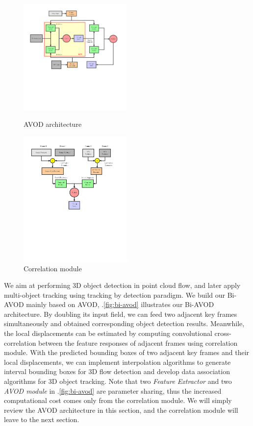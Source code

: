 \documentclass{bmvc2k}
\begin{document}
\begin{figure}
	\setlength{\abovecaptionskip}{-0.5cm}
	\begin{minipage}[t]{0.5\linewidth}
		\centering
		\includegraphics[trim={0cm, 8cm, 2cm, 0cm}, clip, width=2.2in]{images/AVOD.pdf}
		\caption{AVOD architecture}
		\label{fig:avod}
	\end{minipage}%
	\begin{minipage}[t]{0.5\linewidth}
		\centering
		\includegraphics[trim={0cm, 9cm, 2cm, 0cm}, clip, width=2.2in]{images/Correlation.pdf}
		\caption{Correlation module}
		\label{fig:correlation}
	\end{minipage}
\end{figure}

We aim at performing 3D object detection in point cloud flow, and later apply multi-object tracking using tracking by detection paradigm. We build our Bi-AVOD mainly based on AVOD\cite{ku2018joint}, \figurename .\ref{fig:bi-avod} illustrates our Bi-AVOD architecture. By doubling its input field, we can feed two adjacent key frames simultaneously and obtained corresponding object detection results. Meanwhile, the local displacements can be estimated by computing convolutional cross-correlation between the feature responses of adjacent frames using correlation module. With the predicted bounding boxes of two adjacent key frames and their local displacements, we can implement interpolation algorithms to generate interval bounding boxes for 3D flow detection and develop data association algorithms for 3D object tracking. Note that two \textit{Feature Extractor} and two \textit{AVOD module} in \figurename .\ref{fig:bi-avod} are parameter sharing, thus the increased computational cost comes only from the correlation module. We will simply review the AVOD architecture in this section, and the correlation module will leave to the next section.
\end{document}
